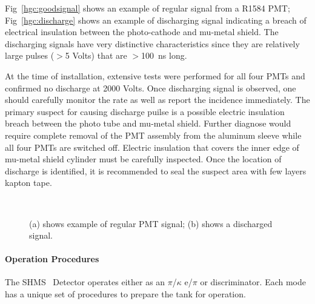 {%

Fig~\ref{hgc:goodsignal} shows an example of regular signal from a
R1584 PMT; Fig~\ref{hgc:discharge} shows an example of discharging
signal indicating a breach of electrical insulation between the
photo-cathode and mu-metal shield. The discharging signals have very
distinctive characteristics since they are relatively large pulses
($>$5 Volts) that are $>$100~ns long.

At the time of installation, extensive tests were performed for all
four PMTs and confirmed no discharge at 2000 Volts. Once discharging
signal is observed, one should carefully monitor the rate as well as
report the incidence immediately. The primary suspect for causing
discharge puilse is a possible electric insulation breach between the
photo tube and mu-metal shield. Further diagnose would require
complete removal of the PMT assembly from the aluminum sleeve while
all four PMTs are switched off. Electric insulation that covers the
inner edge of mu-metal shield cylinder must be carefully
inspected. Once the location of discharge is identified, it is
recommended to seal the suspect area with few layers kapton tape.







\begin{figure}
     \centering
     ~
     \caption{(a) shows example of regular PMT signal; (b) shows a discharged signal.}
     \label{hgc:signal}
\end{figure}


%
%
%






{\color{red}


\paragraph{Operation Procedures}
%
%
The SHMS \Cerenkov\ Detector operates either as an $\pi$/$\kappa$ e/$\pi$ or
discriminator. Each mode has a unique set of procedures to prepare the tank
for operation.


}}
